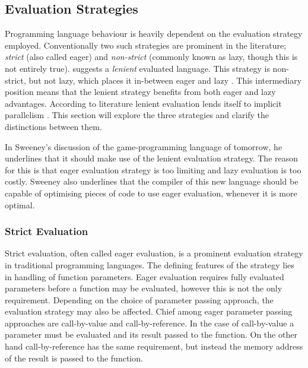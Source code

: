 \subsection{Evaluation Strategies}
Programming language behaviour is heavily dependent on the evaluation strategy employed. Conventionally two such strategies are prominent in the literature\cite{DBLP:journals/cl/Tremblay-lenient}; \textit{strict} (also called eager) and \textit{non-strict} (commonly known as lazy, though this is not entirely true). \cite{DBLP:journals/cl/Tremblay-lenient} suggests a \textit{lenient} evaluated language. This strategy is non-strict, but not lazy, which places it in-between eager and lazy \cite{DBLP:journals/cl/Tremblay-lenient}. This intermediary position means that the lenient strategy benefits from both eager and lazy advantages. According to literature lenient evaluation lends itself to implicit parallelism \cite{DBLP:journals/cl/Tremblay-parallel}. This section will explore the three strategies and clarify the distinctions between them.

In Sweeney's discussion of the game-programming language of tomorrow, he underlines that it should make use of the lenient evaluation strategy\cite{theNextMainstreanProgrammingLanguage}. The reason for this is that eager evaluation strategy is too limiting and lazy evaluation is too costly. Sweeney also underlines that the compiler of this new language should be capable of optimising pieces of code to use eager evaluation, whenever it is more optimal.

\subsubsection{Strict Evaluation}
Strict evaluation, often called eager evaluation, is a prominent evaluation strategy in traditional programming languages. The defining features of the strategy lies in handling of function parameters. Eager evaluation requires fully evaluated parameters before a function may be evaluated\cite[p.~103]{huttel2010transitions}, however this is not the only requirement. Depending on the choice of parameter passing approach, the evaluation strategy may also be affected. Chief among eager parameter passing approaches are call-by-value and call-by-reference. In the case of call-by-value a parameter must be evaluated and its result passed to the function. On the other hand call-by-reference has the same requirement, but instead the memory address of the result is passed to the function.

